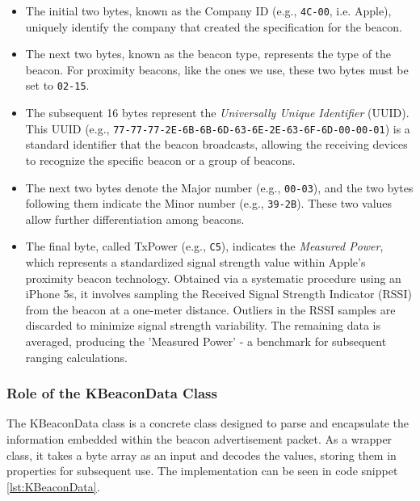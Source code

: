 \begin{itemize}
  \item The initial two bytes, known as the Company ID (e.g., \texttt{4C-00}, i.e. Apple), uniquely identify the company that created the specification for the beacon.
  \item The next two bytes, known as the beacon type, represents the type of the beacon. For proximity beacons, like the ones we use, these two bytes must be set to \texttt{02-15}.
  \item The subsequent 16 bytes represent the \textit{Universally Unique Identifier} (UUID).
This UUID (e.g., \texttt{77-77-77-2E-6B-6B-6D-63-6E-2E-63-6F-6D-00-00-01}) is a standard identifier that the beacon broadcasts, allowing the receiving devices to recognize the specific beacon or a group of beacons.
  \item The next two bytes denote the Major number (e.g., \texttt{00-03}), and the two bytes following them indicate the Minor number (e.g., \texttt{39-2B}).
These two values allow further differentiation among beacons.
  \item The final byte, called TxPower (e.g., \texttt{C5}), indicates the \textit{Measured Power}, which represents a standardized signal strength value within Apple's proximity beacon technology. Obtained via a systematic procedure using an iPhone 5s, it involves sampling the Received Signal Strength Indicator (RSSI) from the beacon at a one-meter distance. Outliers in the RSSI samples are discarded to minimize signal strength variability. The remaining data is averaged, producing the 'Measured Power' - a benchmark for subsequent ranging calculations.
\end{itemize}
\cite{apple2023ibeacon}

\subsubsection{Role of the KBeaconData Class}

The KBeaconData class is a concrete class designed to parse and encapsulate the information embedded within the beacon advertisement packet.
As a wrapper class, it takes a byte array as an input and decodes the values, storing them in properties for subsequent use.
The implementation can be seen in code snippet \ref{lst:KBeaconData}.



